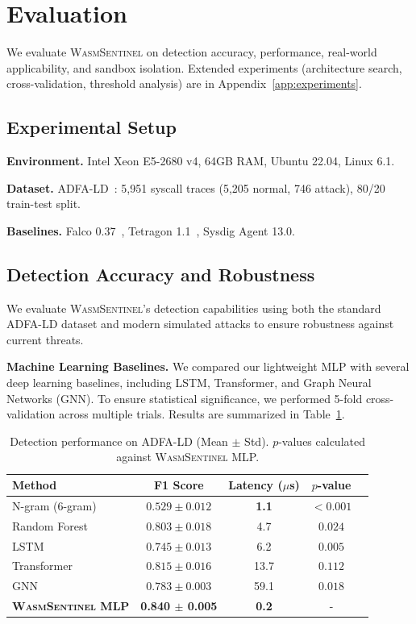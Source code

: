 
\section{Evaluation}
\label{sec:evaluation}

We evaluate \textsc{WasmSentinel} on detection accuracy, performance, real-world applicability, and sandbox isolation.
Extended experiments (architecture search, cross-validation, threshold analysis) are in Appendix~\ref{app:experiments}.

\subsection{Experimental Setup}

\textbf{Environment.}
Intel Xeon E5-2680 v4, 64GB RAM, Ubuntu 22.04, Linux 6.1.

\textbf{Dataset.}
ADFA-LD~\cite{adfa-ld}: 5,951 syscall traces (5,205 normal, 746 attack), 80/20 train-test split.

\textbf{Baselines.}
Falco 0.37~\cite{falco}, Tetragon 1.1~\cite{tetragon}, Sysdig Agent 13.0.

\subsection{Detection Accuracy and Robustness}

We evaluate \textsc{WasmSentinel}'s detection capabilities using both the standard ADFA-LD dataset and modern simulated attacks to ensure robustness against current threats.

\textbf{Machine Learning Baselines.}
We compared our lightweight MLP with several deep learning baselines, including LSTM, Transformer, and Graph Neural Networks (GNN). To ensure statistical significance, we performed 5-fold cross-validation across multiple trials. Results are summarized in Table~\ref{tab:accuracy}.

\begin{table}[t]
\centering
\caption{Detection performance on ADFA-LD (Mean $\pm$ Std). $p$-values calculated against \textsc{WasmSentinel} MLP.}
\label{tab:accuracy}
\begin{tabular}{lcccc}
\toprule
\textbf{Method} & \textbf{F1 Score} & \textbf{Latency ($\mu$s)} & \textbf{$p$-value} \\
\midrule
N-gram (6-gram) & $0.529 \pm 0.012$ & \textbf{1.1} & $< 0.001$ \\
Random Forest & $0.803 \pm 0.018$ & 4.7 & $0.024$ \\
LSTM & $0.745 \pm 0.013$ & 6.2 & $0.005$ \\
Transformer & $0.815 \pm 0.016$ & 13.7 & $0.112$ \\
GNN & $0.783 \pm 0.003$ & 59.1 & $0.018$ \\
\textbf{\textsc{WasmSentinel} MLP} & \textbf{0.840 $\pm$ 0.005} & \textbf{0.2} & - \\
\bottomrule
\end{tabular}
\end{table}

